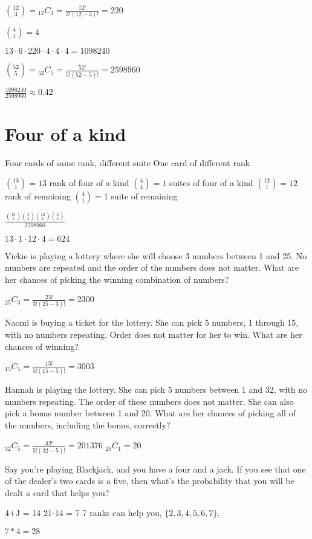 \documentclass{article}
\newcommand*{\Comb}[2]{{}_{#1}C_{#2}}%
\begin{document}
$\binom{12}{3} = \Comb{12}{3} = \frac{12!}{3!(12-3)!} = 220$

$\binom{4}{1} = 4$

$13 \cdot 6 \cdot 220 \cdot 4 \cdot 4 \cdot 4 = 1098240$

$\binom{52}{5} = \Comb{52}{5} = \frac{52!}{5!(52-5)!} = 2598960$

$\frac{1098240}{2598960} \approx 0.42$


\section{Four of a kind}
Four cards of same rank, different suite
One card of different rank

$\binom{13}{1} = 13$ rank of four of a kind
$\binom{4}{4} = 1$ suites of four of a kind
$\binom{12}{1} = 12$ rank of remaining
$\binom{4}{1} = 1$ suite of remaining

$\frac{\binom{13}{1}\binom{4}{4}\binom{12}{1}\binom{4}{4}}{2598960}$

$13 \cdot 1 \cdot 12 \cdot 4 = 624$

Vickie is playing a lottery where she will choose 3 numbers between 1 and 25. No numbers are repeated and the order of the numbers does not matter. What are her chances of picking the winning combination of numbers?

$\Comb{25}{3} = \frac{25!}{3!(25-3)!} = 2300$

Naomi is buying a ticket for the lottery. She can pick 5 numbers, 1 through 15, with no numbers repeating. Order does not matter for her to win. What are her chances of winning?

$\Comb{15}{5} = \frac{15!}{5!(15-5)!} = 3003$

Hannah is playing the lottery. She can pick 5 numbers between 1 and 32, with no numbers repeating. The order of these numbers does not matter. She can also pick a bonus number between 1 and 20. What are her chances of picking all of the numbers, including the bonus, correctly?

$\Comb{32}{5} = \frac{32!}{5!(32-5)!} = 201376$
$\Comb{20}{1} = 20$


Say you're playing Blackjack, and you have a four and a jack. If you see that one of the dealer's two cards is a five, then what's the probability that you will be dealt a card that helps you?

4+J = 14
21-14 = 7
7 ranks can help you, $\{2, 3, 4, 5, 6, 7\}$.

$7*4 = 28$
\end{document}
